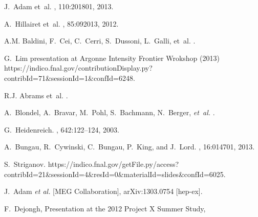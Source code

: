 \begin{thebibliography}{99}
J.~Adam et~al.
, 110:201801, 2013.

A.~Hillairet et~al.
, 85:092013, 2012.

A.M. Baldini, F.~Cei, C.~Cerri, S.~Dussoni, L.~Galli, et~al.
.

G.~Lim presentation at Argonne Intensity Frontier Wrokshop (2013) \hfill\break 
{\small https://indico.fnal.gov/contributionDisplay.py?contribId=71\&sessionId=1\&confId=6248}.

R.J. Abrams et~al.
.

A.~Blondel, A.~Bravar, M.~Pohl, S.~Bachmann, N.~Berger, {\it et~al.}
.

G.~Heidenreich.
, 642:122--124, 2003.

A.~Bungau, R.~Cywinski, C.~Bungau, P.~King, and J.~Lord.
, 16:014701, 2013.

S.~Striganov.
{\small 
  https://indico.fnal.gov/getFile.py/access?contribId=21\&sessionId=4\&resId=0\&materialId=slides\&confId=6025.}


  J.~Adam {\it et al.}  [MEG Collaboration],
  arXiv:1303.0754 [hep-ex].
  
F.~Dejongh, Presentation at the 2012 Project X Summer Study, \hfill{}


\end{thebibliography}
